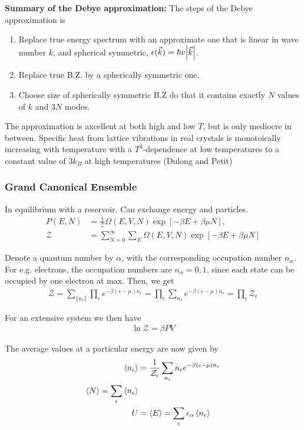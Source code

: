\documentclass[a4paper, english, 12pt]{article}
\newcommand{\eps}{\epsilon}
\begin{document}
\begin{multicols*}{2}
\textbf{Summary of the Debye approximation:}
The steps of the Debye approximation is  
\begin{enumerate}
    \item Replace true energy spectrum with an approximate one that is linear in wave number $k$, and spherical symmetric, $\eps(\vec{k})=\hbar v \abs{\vec{k}}$.
    \item Replace true B.Z. by a spherically symmetric one. 
    \item Choose size of spherically symmetric B.Z do that it contains exactly $N$ values of $k$ and $3N$ modes. 
\end{enumerate} 
The approximation is axcellent at both high and low $T$, but is only mediocre in between. Specific heat from lattice vibrations in real crystals is monotoically increasing with temperature with a $T^3$-dependence at low temperatures to a constant value of $3k_B$ at high temperatures (Dulong and Petit) 

\subsubsection*{\scriptsize Grand Canonical Ensemble}
In equilibrium with a reservoir. Can exchange energy and particles. 
\begin{align*}
    P(E,N) &= \frac{1}{\mathcal{Z}}\Omega(E,V,N) \exp[-\beta E + \beta \mu N], \\
    \mathcal{Z} &= \sum_{N=0}^\infty \sum_E \Omega(E,V,N)\exp[-\beta E + \beta \mu N]
\end{align*}

Denote a quantum number by $\alpha$, with the corresponding occupation number $n_\alpha$. For e.g. electrons, the occupation numbers are $n_\alpha=0,1$, since each state can be occupied by one electron at max. Then, we get 
\begin{align*}
    \mathcal{Z} = \sum_{\{n_\epsilon\}} \prod_\epsilon e^{-\beta(\epsilon-\mu)n_\epsilon} = \prod_\epsilon \sum_{n_\epsilon} e^{-\beta(\epsilon-\mu)n_\epsilon} = \prod_\epsilon \mathcal{Z}_\epsilon
\end{align*} 


For an extensive system we then have 
\begin{align*}
    \ln\mathcal{Z} = \beta PV 
\end{align*}

The average values at a particular energy are now given by 
\begin{align*}
    \expval{n_\epsilon} &= \frac{1}{\mathcal{Z}_\epsilon} \sum_{n_\epsilon} n_\epsilon e^{-\beta(\epsilon-\mu)n_\epsilon} \\ 
    \expval{N} = \sum_\epsilon \expval{n_\epsilon} \\ 
    U &= \expval{E} = \sum_\eps \eps_\alpha \expval{n_\eps}
\end{align*}


\end{multicols*}
\end{document}
